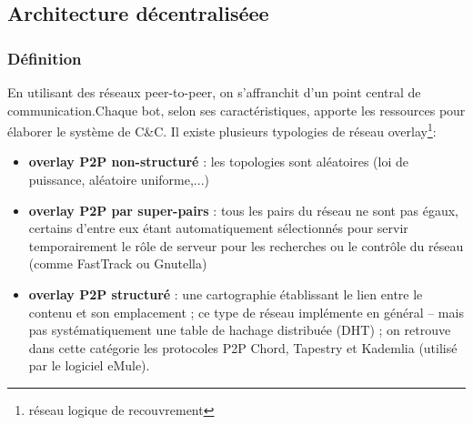 





\subsection{Architecture décentraliséee}


\subsubsection{Définition}
\par En utilisant des réseaux peer-to-peer, on s’affranchit d'un point central de communication.Chaque bot, selon ses caractéristiques, apporte les ressources pour élaborer le système de C\&C.
Il existe plusieurs typologies de réseau overlay\footnote{réseau logique de recouvrement}:
\begin{itemize}
	\item \textbf{overlay P2P non-structuré} : les topologies sont aléatoires (loi de puissance, aléatoire uniforme,...)
  \item \textbf{overlay P2P par super-pairs} : tous les pairs du réseau ne sont pas égaux, certains d’entre eux étant automatiquement sélectionnés pour servir temporairement le rôle de serveur pour les recherches ou le contrôle du réseau (comme FastTrack ou Gnutella)
  \item \textbf{overlay P2P structuré} : une cartographie établissant le lien entre le contenu et son emplacement ; ce type de réseau implémente en général – mais pas systématiquement une table de hachage distribuée (DHT) ; on retrouve dans cette catégorie les protocoles P2P Chord, Tapestry et Kademlia (utilisé par le logiciel eMule).
\end{itemize}

